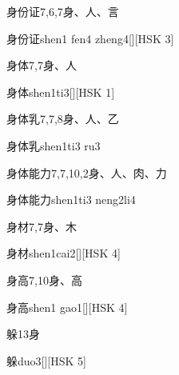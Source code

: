 \begin{entry}{身份证}{7,6,7}{⾝、⼈、⾔}
  \begin{phonetics}{身份证}{shen1 fen4 zheng4}[][HSK 3]
  \end{phonetics}
\end{entry}

\begin{entry}{身体}{7,7}{⾝、⼈}
  \begin{phonetics}{身体}{shen1ti3}[][HSK 1]
  \end{phonetics}
\end{entry}

\begin{entry}{身体乳}{7,7,8}{⾝、⼈、⼄}
  \begin{phonetics}{身体乳}{shen1ti3 ru3}
  \end{phonetics}
\end{entry}

\begin{entry}{身体能力}{7,7,10,2}{⾝、⼈、⾁、⼒}
  \begin{phonetics}{身体能力}{shen1ti3 neng2li4}
  \end{phonetics}
\end{entry}

\begin{entry}{身材}{7,7}{⾝、⽊}
  \begin{phonetics}{身材}{shen1cai2}[][HSK 4]
  \end{phonetics}
\end{entry}

\begin{entry}{身高}{7,10}{⾝、⾼}
  \begin{phonetics}{身高}{shen1 gao1}[][HSK 4]
  \end{phonetics}
\end{entry}

\begin{entry}{躲}{13}{⾝}
  \begin{phonetics}{躲}{duo3}[][HSK 5]
  \end{phonetics}
\end{entry}

